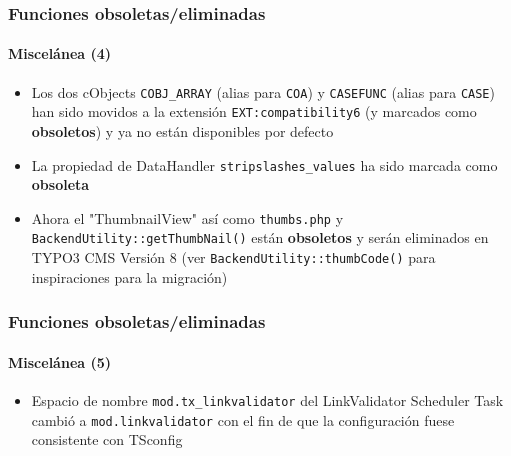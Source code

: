 \begin{frame}[fragile]
	\frametitle{Funciones obsoletas/eliminadas}
	\framesubtitle{Miscelánea (4)}

	\lstset{basicstyle=\tiny\ttfamily}

	\begin{itemize}

		\item Los dos cObjects
			\small\texttt{COBJ\_ARRAY}\normalsize\space
			(alias para \texttt{COA})
			y
			\small\texttt{CASEFUNC}\normalsize\space
			(alias para \texttt{CASE})
			han sido movidos a la extensión \texttt{EXT:compatibility6}
			(y marcados como \textbf{obsoletos})
			y ya no están disponibles por defecto

		\item La propiedad de DataHandler 
			\small\texttt{stripslashes\_values}\normalsize\space
			ha sido marcada como \textbf{obsoleta}

		\item Ahora el "ThumbnailView" así como \texttt{thumbs.php} y \texttt{BackendUtility::getThumbNail()}
			están \textbf{obsoletos} y serán eliminados en TYPO3 CMS Versión 8\newline
			(ver \texttt{BackendUtility::thumbCode()} para inspiraciones para la migración)

	\end{itemize}

\end{frame}


\begin{frame}[fragile]
	\frametitle{Funciones obsoletas/eliminadas}
	\framesubtitle{Miscelánea (5)}

	\lstset{basicstyle=\tiny\ttfamily}

	\begin{itemize}

		\item Espacio de nombre \texttt{mod.tx\_linkvalidator} del LinkValidator
			Scheduler Task cambió a \texttt{mod.linkvalidator} con el fin de 
			que la configuración fuese consistente con TSconfig

	\end{itemize}

\end{frame}

